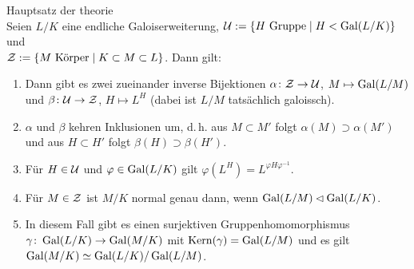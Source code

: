 \begin{Theorem}{Hauptsatz der theorie}\\
    Seien $L/K$ eine endliche Galoiserweiterung,
    $\mathcal{U} := \{H \text{ Gruppe} \;|\; H < \operatorname{Gal}(L/K)\}$ und\\
    $\mathcal{Z} := \{M \text{ Körper} \;|\; K \subset M \subset L\}$.
    Dann gilt:
    \begin{enumerate}[label=(\alph*)]
        \item
        Dann gibt es zwei zueinander inverse Bijektionen
        $\alpha\colon \mathcal{Z} \rightarrow \mathcal{U}$, $M \mapsto \operatorname{Gal}(L/M)$ und
        $\beta\colon \mathcal{U} \rightarrow \mathcal{Z}$, $H \mapsto L^H$
        (dabei ist $L/M$ tatsächlich galoissch).

        \item
        $\alpha$ und $\beta$ kehren Inklusionen um, d.\,h.
        aus $M \subset M'$ folgt $\alpha(M) \supset \alpha(M')$ und
        aus $H \subset H'$ folgt $\beta(H) \supset \beta(H')$.

        \item
        Für $H \in \mathcal{U}$ und $\varphi \in \operatorname{Gal}(L/K)$ gilt
        $\varphi(L^H) = L^{\varphi H \varphi^{-1}}$.

        \item
        Für $M \in \mathcal{Z}$ ist $M/K$ normal genau dann, wenn
        $\operatorname{Gal}(L/M) \mathbin{\vartriangleleft} \operatorname{Gal}(L/K)$.

        \item
        In diesem Fall gibt es einen surjektiven Gruppenhomomorphismus\\
        $\gamma\colon \operatorname{Gal}(L/K) \rightarrow \operatorname{Gal}(M/K)$ mit
        $\operatorname{Kern}(\gamma) = \operatorname{Gal}(L/M)$ und es gilt\\
        $\operatorname{Gal}(M/K) \simeq \operatorname{Gal}(L/K)/\operatorname{Gal}(L/M)$.
    \end{enumerate}
\end{Theorem}

\linie

